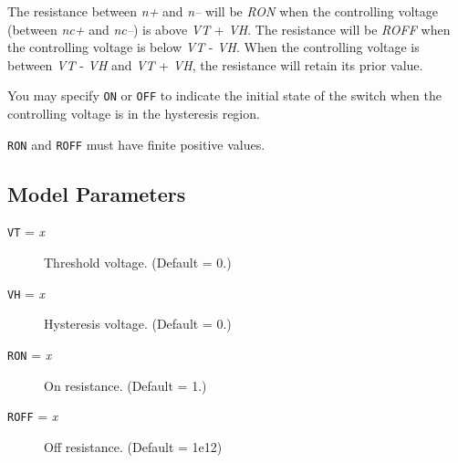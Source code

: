 The resistance between {\it n+} and {\it n--} will be {\it RON}
when the controlling voltage (between {\it nc+} and {\it nc--}) is
above {\it VT} + {\it VH}.  The resistance will be {\it ROFF} when
the controlling voltage is below {\it VT} - {\it VH}.  When the
controlling voltage is between {\it VT} - {\it VH} and {\it VT} +
{\it VH}, the resistance will retain its prior value.

You may specify {\tt ON} or {\tt OFF} to indicate the initial state
of the switch when the controlling voltage is in the hysteresis
region.

{\tt RON} and {\tt ROFF} must have finite positive values.
\subsection{Model Parameters}

\begin{description}

\item[{\tt VT} = {\it x}] Threshold voltage.  (Default = 0.)

\item[{\tt VH} = {\it x}] Hysteresis voltage.  (Default = 0.)

\item[{\tt RON} = {\it x}] On resistance.  (Default = 1.)

\item[{\tt ROFF} = {\it x}] Off resistance.  (Default = 1e12)

\end{description}
